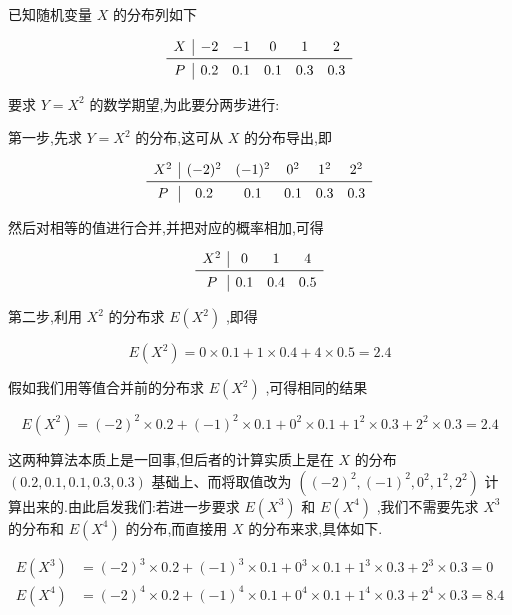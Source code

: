 \begin{example}\label{exam:2.2.6}
	已知随机变量 $ X $ 的分布列如下
	
	\[
	\begin{array}{c|ccccc}
	X &{-2} & {-1} & {0} & {1} & {2} \\ \midrule
	P & {0.2} & {0.1} & {0.1} & {0.3} & {0.3}
	\end{array}
	\]
	
	要求 $ Y=X^2 $ 的数学期望,为此要分两步进行:
	
	第一步,先求 $ Y=X^2 $ 的分布,这可从 $ X $ 的分布导出,即
	
	\[
	\begin{array}{c|ccccc}
	X^2    & (-2)^2 & (-1)^2 & 0^2    & 1^2    & 2^2 \\\midrule
	P     & 0.2   & 0.1   & 0.1   & 0.3   & 0.3 \\
	\end{array}
	\]
	
	然后对相等的值进行合并,并把对应的概率相加,可得
	
	\[
	\begin{array}{c|ccc}
	X^2    & 0     & 1     & 4 \\\midrule
	P     & 0.1   & 0.4   & 0.5 \\
	\end{array}
	\]
	
	第二步,利用 $ X^2 $ 的分布求 $ E(X^2) $ ,即得
	
	\[
	E\left(X^{2}\right)=0 \times 0.1+1 \times 0.4+4 \times 0.5=2.4
	\]
	
	假如我们用等值合并前的分布求 $ E(X^2) $ ,可得相同的结果
	
	\[
	E\left(X^{2}\right)=(-2)^{2} \times 0.2+(-1)^{2} \times 0.1+0^{2} \times 0.1+1^{2} \times 0.3+2^{2} \times 0.3=2.4
	\]
	
	这两种算法本质上是一回事,但后者的计算实质上是在 $ X $ 的分布 $ (0.2,
	0.1,0.1,0.3,0.3) $ 基础上、而将取值改为 $ \left((-2)^{2},(-1)^{2}, 0^{2}, 1^{2}, 2^{2}\right) $ 计算出来的.由此启发我们:若进一步要求 $ E(X^3) $ 和 $ E(X^4) $ ,我们不需要先求 $ X^3 $ 的分布和 $ E\left(X^{4}\right) $ 的分布,而直接用 $ X $ 的分布来求,具体如下.
	
	\[
	\begin{aligned} 
	E\left(X^{3}\right) &=(-2)^{3} \times 0.2+(-1)^{3} \times 0.1+0^{3} \times 0.1+1^{3} \times 0.3+2^{3} \times 0.3=0 \\ E\left(X^{4}\right) &=(-2)^{4} \times 0.2+(-1)^{4} \times 0.1+0^{4} \times 0.1+1^{4} \times 0.3+2^{4} \times 0.3=8.4 
	\end{aligned}
	\]
	
\end{example}



